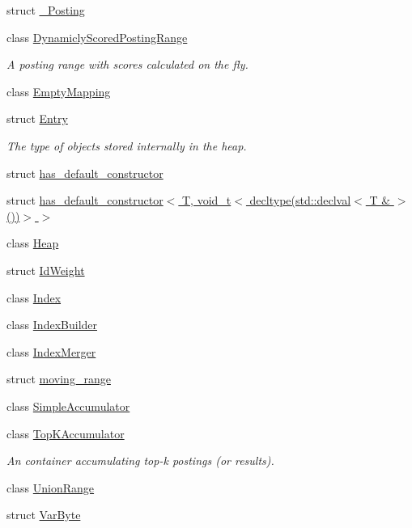 \begin{DoxyCompactItemize}
\item 
struct \hyperlink{structirkit_1_1__Posting}{\+\_\+\+Posting}
\item 
class \hyperlink{classirkit_1_1DynamiclyScoredPostingRange}{Dynamicly\+Scored\+Posting\+Range}
\begin{DoxyCompactList}\small\item\em A posting range with scores calculated on the fly. \end{DoxyCompactList}\item 
class \hyperlink{classirkit_1_1EmptyMapping}{Empty\+Mapping}
\item 
struct \hyperlink{structirkit_1_1Entry}{Entry}
\begin{DoxyCompactList}\small\item\em The type of objects stored internally in the heap. \end{DoxyCompactList}\item 
struct \hyperlink{structirkit_1_1has__default__constructor}{has\+\_\+default\+\_\+constructor}
\item 
struct \hyperlink{structirkit_1_1has__default__constructor_3_01T_00_01void__t_3_01decltype_07std_1_1declval_3_01T_01_6_01_4_07_08_08_4_01_4}{has\+\_\+default\+\_\+constructor$<$ T, void\+\_\+t$<$ decltype(std\+::declval$<$ T \& $>$())$>$ $>$}
\item 
class \hyperlink{classirkit_1_1Heap}{Heap}
\item 
struct \hyperlink{structirkit_1_1IdWeight}{Id\+Weight}
\item 
class \hyperlink{classirkit_1_1Index}{Index}
\item 
class \hyperlink{classirkit_1_1IndexBuilder}{Index\+Builder}
\item 
class \hyperlink{classirkit_1_1IndexMerger}{Index\+Merger}
\item 
struct \hyperlink{structirkit_1_1moving__range}{moving\+\_\+range}
\item 
class \hyperlink{classirkit_1_1SimpleAccumulator}{Simple\+Accumulator}
\item 
class \hyperlink{classirkit_1_1TopKAccumulator}{Top\+K\+Accumulator}
\begin{DoxyCompactList}\small\item\em An container accumulating top-\/k postings (or results). \end{DoxyCompactList}\item 
class \hyperlink{classirkit_1_1UnionRange}{Union\+Range}
\item 
struct \hyperlink{structirkit_1_1VarByte}{Var\+Byte}
\end{DoxyCompactItemize}
